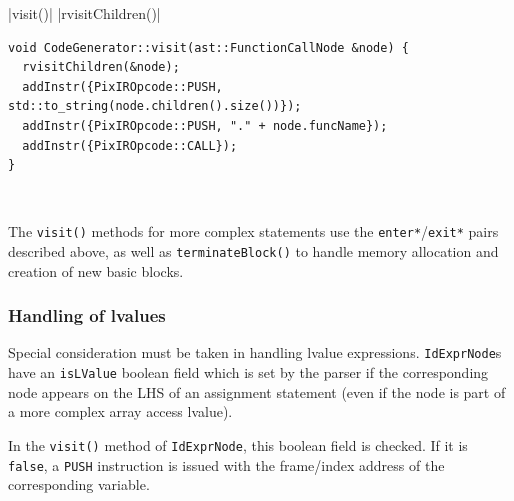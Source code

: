 \documentclass[11pt,a4paper]{scrartcl}
\begin{document}
|visit()|
|rvisitChildren()|
\begin{lstfloat}

\begin{verbatim}
void CodeGenerator::visit(ast::FunctionCallNode &node) {
  rvisitChildren(&node);
  addInstr({PixIROpcode::PUSH, std::to_string(node.children().size())});
  addInstr({PixIROpcode::PUSH, "." + node.funcName});
  addInstr({PixIROpcode::CALL});
}
\end{verbatim}
  \caption{\protect{} method for \Verb|FunctionCallNode|s. Note the use of \protect{}, so that in the generated code each argument is pushed onto the stack in reverse order of declaration, as required by the PixAR VM semantics.}~\label{lst:codegen-example-1}
\end{lstfloat}

The \verb|visit()| methods for more complex statements use the \verb|enter*|/\verb|exit*| pairs described above, as well as \verb|terminateBlock()| to handle memory allocation and creation of new basic blocks.




\subsubsection{Handling of lvalues}

Special consideration must be taken in handling lvalue expressions. \verb|IdExprNode|s have an \verb|isLValue| boolean field which is set by the parser if the corresponding node appears on the LHS of an assignment statement (even if the node is part of a more complex array access lvalue).

In the \verb|visit()| method of \verb|IdExprNode|, this boolean field is checked. If it is \verb|false|, a \verb|PUSH| instruction is issued with the frame/index address of the corresponding variable.
\end{document}
